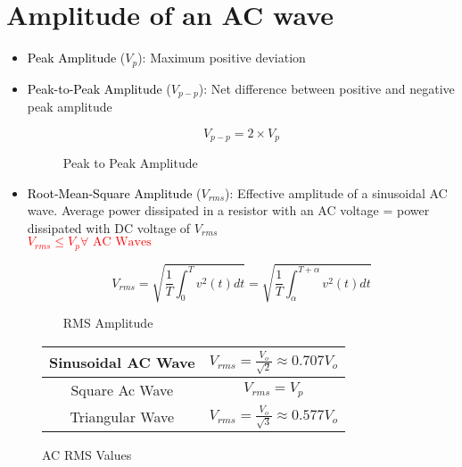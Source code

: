 \documentclass{book/custombook}
\begin{document}
        \section{Amplitude of an AC wave}
            \begin{itemize}
                \item \textcolor{black}{Peak Amplitude} ($V_p$): Maximum positive deviation
                \item \textcolor{black}{Peak-to-Peak Amplitude} ($V_{p-p}$): Net difference between positive
                    and negative peak amplitude
                    \begin{figure}[H]
                        \centering
                        \begin{equation}V_{p-p} = 2\times V_p\end{equation}
                        \caption{Peak to Peak Amplitude}
                    \end{figure}
                \item \textcolor{black}{Root-Mean-Square Amplitude} ($V_{rms}$): Effective amplitude of a sinusoidal AC
                    wave. Average power dissipated in a resistor with an AC voltage = power dissipated with DC voltage of
                    $V_{rms}$\\
                    \textcolor{red}{$V_{rms} \leq V_{p} \forall \text{ AC Waves}$}
                    \begin{figure}[H]
                        \centering
                        \begin{equation}
                            V_{rms} = \sqrt{\frac{1}{T} \int^{T}_{0} v^{2}(t) dt} 
                                    = \sqrt{\frac{1}{T} \int^{T+\alpha}_{\alpha} v^{2} (t) dt}
                        \end{equation}
                        \caption{RMS Amplitude}
                    \end{figure}
            \end{itemize}
            \begin{figure}[H]
                \centering
                \begin{tabular}{|c|c|}
                    \hline
                    Sinusoidal AC Wave & $V_{rms} = \frac{V_o}{\sqrt{2}} \approx 0.707V_o$\\
                    \hline
                    Square Ac Wave & $V_{rms} = V_p$\\
                    \hline
                    Triangular Wave & $V_{rms} = \frac{V_o}{\sqrt{3}} \approx 0.577V_o$\\
                    \hline
                \end{tabular}
                \caption{AC RMS Values}
            \end{figure}
\end{document}
